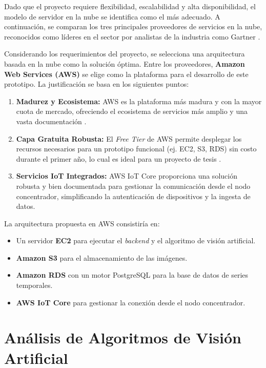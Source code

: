 Dado que el proyecto requiere flexibilidad, escalabilidad y alta disponibilidad, el modelo de servidor en la nube se identifica como el más adecuado. A continuación, se comparan los tres principales proveedores de servicios en la nube, reconocidos como líderes en el sector por analistas de la industria como Gartner \cite{gartner2023magic}.




Considerando los requerimientos del proyecto, se selecciona una arquitectura basada en la nube como la solución óptima. Entre los proveedores, \textbf{Amazon Web Services (AWS)} se elige como la plataforma para el desarrollo de este prototipo. La justificación se basa en los siguientes puntos:

\begin{enumerate}
    \item \textbf{Madurez y Ecosistema:} AWS es la plataforma más madura y con la mayor cuota de mercado, ofreciendo el ecosistema de servicios más amplio y una vasta documentación \cite{coursera2024}.
    \item \textbf{Capa Gratuita Robusta:} El \textit{Free Tier} de AWS permite desplegar los recursos necesarios para un prototipo funcional (ej. EC2, S3, RDS) sin costo durante el primer año, lo cual es ideal para un proyecto de tesis \cite{aws2024freetier}.
    \item \textbf{Servicios IoT Integrados:} AWS IoT Core proporciona una solución robusta y bien documentada para gestionar la comunicación desde el nodo concentrador, simplificando la autenticación de dispositivos y la ingesta de datos.
\end{enumerate}

La arquitectura propuesta en AWS consistiría en:
\begin{itemize}
    \item Un servidor \textbf{EC2} para ejecutar el \textit{backend} y el algoritmo de visión artificial.
    \item \textbf{Amazon S3} para el almacenamiento de las imágenes.
    \item \textbf{Amazon RDS} con un motor PostgreSQL para la base de datos de series temporales.
    \item \textbf{AWS IoT Core} para gestionar la conexión desde el nodo concentrador.
\end{itemize}





\section{Análisis de Algoritmos de Visión Artificial}

